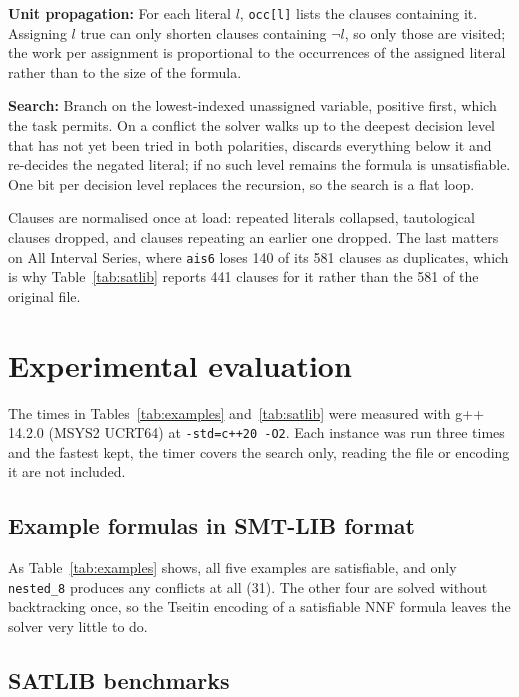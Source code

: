 \documentclass[11pt,a4paper]{article}
\begin{document}
\textbf{Unit propagation:} For each literal $l$, \texttt{occ[l]} lists the
clauses containing it. Assigning $l$ true can only shorten clauses containing
$\lnot l$, so only those are visited; the work per assignment is proportional to
the occurrences of the assigned literal rather than to the size of the formula.

\textbf{Search:} Branch on the lowest-indexed unassigned variable, positive
first, which the task permits. On a conflict the solver walks up to the deepest
decision level that has not yet been tried in both polarities, discards
everything below it and re-decides the negated literal; if no such level
remains the formula is unsatisfiable. One bit per decision level replaces the
recursion, so the search is a flat loop.

Clauses are normalised once at load: repeated literals collapsed, tautological
clauses dropped, and clauses repeating an earlier one dropped. The last matters
on All Interval Series, where \texttt{ais6} loses 140 of its 581 clauses as
duplicates, which is why Table~\ref{tab:satlib} reports 441 clauses for it
rather than the 581 of the original file.

\section{Experimental evaluation}

The times in Tables~\ref{tab:examples} and~\ref{tab:satlib} were measured with
g++ 14.2.0 (MSYS2 UCRT64) at \texttt{-std=c++20 -O2}. Each instance was run
three times and the fastest kept, the timer covers the search only, reading the
file or encoding it are not included.

\subsection*{Example formulas in SMT-LIB format}



As Table~\ref{tab:examples} shows, all five examples are satisfiable, and only
\texttt{nested\_8} produces any conflicts at all (31). The other four are solved
without backtracking once, so the Tseitin
encoding of a satisfiable NNF formula leaves the solver very little to do.

\subsection*{SATLIB benchmarks}
\end{document}
